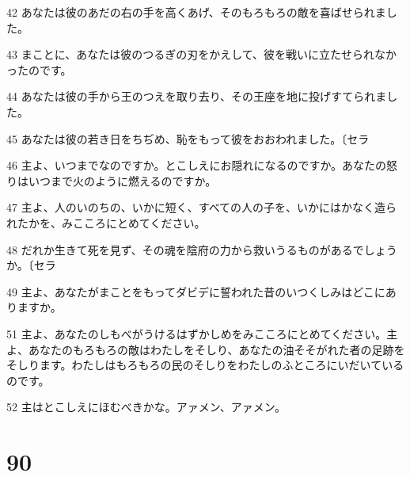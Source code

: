 \par 42 あなたは彼のあだの右の手を高くあげ、そのもろもろの敵を喜ばせられました。
\par 43 まことに、あなたは彼のつるぎの刃をかえして、彼を戦いに立たせられなかったのです。
\par 44 あなたは彼の手から王のつえを取り去り、その王座を地に投げすてられました。
\par 45 あなたは彼の若き日をちぢめ、恥をもって彼をおおわれました。〔セラ
\par 46 主よ、いつまでなのですか。とこしえにお隠れになるのですか。あなたの怒りはいつまで火のように燃えるのですか。
\par 47 主よ、人のいのちの、いかに短く、すべての人の子を、いかにはかなく造られたかを、みこころにとめてください。
\par 48 だれか生きて死を見ず、その魂を陰府の力から救いうるものがあるでしょうか。〔セラ
\par 49 主よ、あなたがまことをもってダビデに誓われた昔のいつくしみはどこにありますか。
\par 51 主よ、あなたのしもべがうけるはずかしめをみこころにとめてください。主よ、あなたのもろもろの敵はわたしをそしり、あなたの油そそがれた者の足跡をそしります。わたしはもろもろの民のそしりをわたしのふところにいだいているのです。
\par 52 主はとこしえにほむべきかな。アァメン、アァメン。

\chapter{90}

